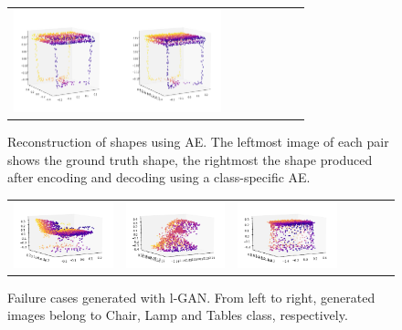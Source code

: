 \documentclass[12pt]{article}
\begin{document}
\begin{figure}
\begin{tabular}{lllllll}
            \includegraphics[width = 60mm]{table_ae_2} \\
        \end{tabular}
        \caption{Reconstruction of shapes using AE. The leftmost image of each pair shows the ground truth shape, the rightmost the shape produced after encoding and decoding using a class-specific AE.}
        \label{figure:samples_generated_with_autoencoders}
    \end{figure}

    \begin{figure}
        \centering
        \begin{tabular}{lllllll}
            \includegraphics[width = 30mm]{chair_latent_gen_3_bad} &
            \includegraphics[width = 30mm]{lamp_latent_gen_3_bad} &
            \includegraphics[width = 30mm]{table_latent_gen_3_bad} \\
        \end{tabular}
        \caption{Failure cases generated with l-GAN. From left to right, generated images belong to Chair, Lamp and Tables class, respectively.}
        \label{figure:bad_samples_generated_with_latent_gan}
    \end{figure}
\end{document}
